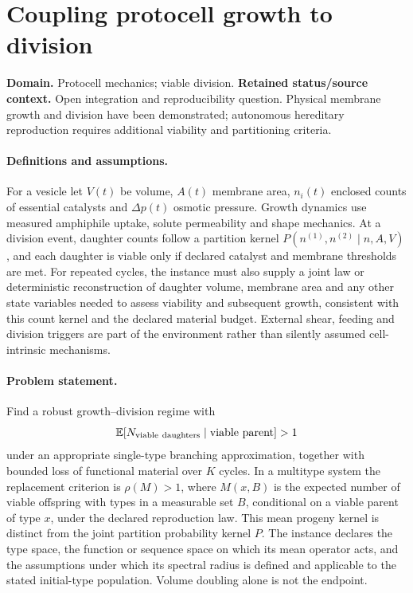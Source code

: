\documentclass[11pt]{article}
\begin{document}
\section*{Coupling protocell growth to division}
\label{prob:297}
\label{rank:194}
\par\smallskip

\noindent\textbf{Domain.} Protocell mechanics; viable division. \quad \textbf{Retained status/source context.} Open integration and reproducibility question. Physical membrane growth and division have been demonstrated; autonomous hereditary reproduction requires additional viability and partitioning criteria.

\paragraph{Definitions and assumptions.} For a vesicle let $V(t)$ be volume, $A(t)$ membrane area, $n_i(t)$ enclosed counts of essential catalysts and $\Delta p(t)$ osmotic pressure. Growth dynamics use measured amphiphile uptake, solute permeability and shape mechanics. At a division event, daughter counts follow a partition kernel $P(n^{(1)},n^{(2)}\mid n,A,V)$, and each daughter is viable only if declared catalyst and membrane thresholds are met. For repeated cycles, the instance must also supply a joint law or deterministic reconstruction of daughter volume, membrane area and any other state variables needed to assess viability and subsequent growth, consistent with this count kernel and the declared material budget. External shear, feeding and division triggers are part of the environment rather than silently assumed cell-intrinsic mechanisms.

\paragraph{Problem statement.} Find a robust growth--division regime with
\[
\mathbb{E}[N_{\rm viable\ daughters}\mid\text{viable parent}]>1
\]
under an appropriate single-type branching approximation, together with bounded loss of functional material over $K$ cycles. In a multitype system the replacement criterion is $\rho(M)>1$, where $M(x,B)$ is the expected number of viable offspring with types in a measurable set $B$, conditional on a viable parent of type $x$, under the declared reproduction law. This mean progeny kernel is distinct from the joint partition probability kernel $P$. The instance declares the type space, the function or sequence space on which its mean operator acts, and the assumptions under which its spectral radius is defined and applicable to the stated initial-type population. Volume doubling alone is not the endpoint.
\end{document}
